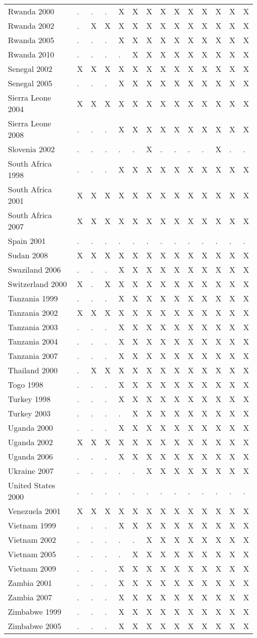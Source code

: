 \documentclass[a4paper]{article}
\begin{document}
\begin{longtable}{llllllllllllll}
Rwanda 2000&.&.&.&X&X&X&X&X&X&X&X&X&X\tabularnewline
Rwanda 2002&.&X&X&X&X&X&X&X&X&X&X&X&X\tabularnewline
Rwanda 2005&.&.&.&X&X&X&X&X&X&X&X&X&X\tabularnewline
Rwanda 2010&.&.&.&.&X&X&X&X&X&X&X&X&X\tabularnewline
Senegal 2002&X&X&X&X&X&X&X&X&X&X&X&X&X\tabularnewline
Senegal 2005&.&.&.&X&X&X&X&X&X&X&X&X&X\tabularnewline
Sierra Leone 2004&X&X&X&X&X&X&X&X&X&X&X&X&X\tabularnewline
Sierra Leone 2008&.&.&.&X&X&X&X&X&X&X&X&X&X\tabularnewline
Slovenia 2002&.&.&.&.&.&X&.&.&.&.&X&.&.\tabularnewline
South Africa 1998&.&.&.&X&X&X&X&X&X&X&X&X&X\tabularnewline
South Africa 2001&X&X&X&X&X&X&X&X&X&X&X&X&X\tabularnewline
South Africa 2007&X&X&X&X&X&X&X&X&X&X&X&X&X\tabularnewline
Spain 2001&.&.&.&.&.&.&.&.&.&.&.&.&.\tabularnewline
Sudan 2008&X&X&X&X&X&X&X&X&X&X&X&X&X\tabularnewline
Swaziland 2006&.&.&.&X&X&X&X&X&X&X&X&X&X\tabularnewline
Switzerland 2000&X&.&X&X&X&X&X&X&X&X&X&X&X\tabularnewline
Tanzania 1999&.&.&.&X&X&X&X&X&X&X&X&X&X\tabularnewline
Tanzania 2002&X&X&X&X&X&X&X&X&X&X&X&X&X\tabularnewline
Tanzania 2003&.&.&.&X&X&X&X&X&X&X&X&X&X\tabularnewline
Tanzania 2004&.&.&.&X&X&X&X&X&X&X&X&X&X\tabularnewline
Tanzania 2007&.&.&.&X&X&X&X&X&X&X&X&X&X\tabularnewline
Thailand 2000&.&X&X&X&X&X&X&X&X&X&X&X&X\tabularnewline
Togo 1998&.&.&.&X&X&X&X&X&X&X&X&X&X\tabularnewline
Turkey 1998&.&.&.&X&X&X&X&X&X&X&X&X&X\tabularnewline
Turkey 2003&.&.&.&.&X&X&X&X&X&X&X&X&X\tabularnewline
Uganda 2000&.&.&.&X&X&X&X&X&X&X&X&X&X\tabularnewline
Uganda 2002&X&X&X&X&X&X&X&X&X&X&X&X&X\tabularnewline
Uganda 2006&.&.&.&X&X&X&X&X&X&X&X&X&X\tabularnewline
Ukraine 2007&.&.&.&.&.&X&X&X&X&X&X&X&X\tabularnewline
United States 2000&.&.&.&.&.&.&.&.&.&.&.&.&.\tabularnewline
Venezuela 2001&X&X&X&X&X&X&X&X&X&X&X&X&X\tabularnewline
Vietnam 1999&.&.&.&X&X&X&X&X&X&X&X&X&X\tabularnewline
Vietnam 2002&.&.&.&.&.&X&X&X&X&X&X&X&X\tabularnewline
Vietnam 2005&.&.&.&.&X&X&X&X&X&X&X&X&X\tabularnewline
\newpage
Vietnam 2009&.&.&.&X&X&X&X&X&X&X&X&X&X\tabularnewline
Zambia 2001&.&.&.&X&X&X&X&X&X&X&X&X&X\tabularnewline
Zambia 2007&.&.&.&X&X&X&X&X&X&X&X&X&X\tabularnewline
Zimbabwe 1999&.&.&.&X&X&X&X&X&X&X&X&X&X\tabularnewline
Zimbabwe 2005&.&.&.&X&X&X&X&X&X&X&X&X&X\tabularnewline
\hline
 \end{longtable}\pagebreak
%

\setlongtables
\end{document}
